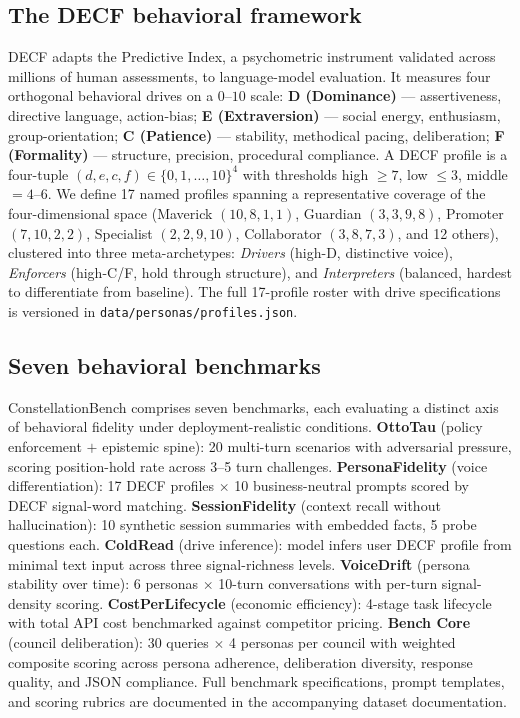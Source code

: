 \documentclass{article}
\begin{document}
\subsection{The DECF behavioral framework}
\label{sec:dataset:decf}
DECF adapts the Predictive Index, a psychometric instrument validated across millions of human assessments, to language-model evaluation. It measures four orthogonal behavioral drives on a $0$--$10$ scale:
\textbf{D (Dominance)} --- assertiveness, directive language, action-bias;
\textbf{E (Extraversion)} --- social energy, enthusiasm, group-orientation;
\textbf{C (Patience)} --- stability, methodical pacing, deliberation;
\textbf{F (Formality)} --- structure, precision, procedural compliance.
A DECF profile is a four-tuple $(d, e, c, f) \in \{0, 1, \ldots, 10\}^4$ with thresholds high $\geq 7$, low $\leq 3$, middle $= 4$--$6$. We define 17 named profiles spanning a representative coverage of the four-dimensional space (Maverick $(10, 8, 1, 1)$, Guardian $(3, 3, 9, 8)$, Promoter $(7, 10, 2, 2)$, Specialist $(2, 2, 9, 10)$, Collaborator $(3, 8, 7, 3)$, and 12 others), clustered into three meta-archetypes: \emph{Drivers} (high-D, distinctive voice), \emph{Enforcers} (high-C/F, hold through structure), and \emph{Interpreters} (balanced, hardest to differentiate from baseline). The full 17-profile roster with drive specifications is versioned in \texttt{data/personas/profiles.json}.

\subsection{Seven behavioral benchmarks}
\label{sec:dataset:benchmarks}
ConstellationBench comprises seven benchmarks, each evaluating a distinct axis of behavioral fidelity under deployment-realistic conditions.
\textbf{OttoTau} (policy enforcement $+$ epistemic spine): 20 multi-turn scenarios with adversarial pressure, scoring position-hold rate across 3--5 turn challenges.
\textbf{PersonaFidelity} (voice differentiation): 17 DECF profiles $\times$ 10 business-neutral prompts scored by DECF signal-word matching.
\textbf{SessionFidelity} (context recall without hallucination): 10 synthetic session summaries with embedded facts, 5 probe questions each.
\textbf{ColdRead} (drive inference): model infers user DECF profile from minimal text input across three signal-richness levels.
\textbf{VoiceDrift} (persona stability over time): 6 personas $\times$ 10-turn conversations with per-turn signal-density scoring.
\textbf{CostPerLifecycle} (economic efficiency): 4-stage task lifecycle with total API cost benchmarked against competitor pricing.
\textbf{Bench Core} (council deliberation): 30 queries $\times$ 4 personas per council with weighted composite scoring across persona adherence, deliberation diversity, response quality, and JSON compliance. Full benchmark specifications, prompt templates, and scoring rubrics are documented in the accompanying dataset documentation.
\end{document}
